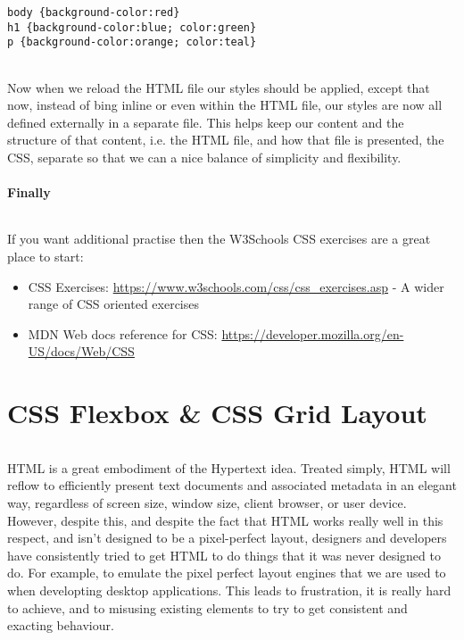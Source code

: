 \documentclass[10pt, a4paper, twosize]{article}
\begin{document}
\begin{lstlisting}
body {background-color:red}
h1 {background-color:blue; color:green}
p {background-color:orange; color:teal}
\end{lstlisting}

\paragraph{} Now when we reload the HTML file our styles should be applied, except that now, instead of bing inline or even within the HTML file, our styles are now all defined externally in a separate file. This helps keep our content and the structure of that content, i.e. the HTML file, and how that file is presented, the CSS, separate so that we can a nice balance of simplicity and flexibility.

\subsection*{Finally}
\paragraph{} If you want additional practise then the W3Schools CSS exercises are a great place to start:
\begin{itemize}
\item CSS Exercises: \url{https://www.w3schools.com/css/css_exercises.asp} - A wider range of CSS oriented exercises
\item MDN Web docs reference for CSS: \url{https://developer.mozilla.org/en-US/docs/Web/CSS}
\end{itemize}







\clearpage
\part{CSS Flexbox \& CSS Grid Layout}
\paragraph{} HTML is a great embodiment of the Hypertext idea. Treated simply, HTML will reflow to efficiently present text documents and associated metadata in an elegant way, regardless of screen size, window size, client browser, or user device. However, despite this, and despite the fact that HTML works really well in this respect, and isn't designed to be a pixel-perfect layout, designers and developers have consistently tried to get HTML to do things that it was never designed to do. For example, to emulate the pixel perfect layout engines that we are used to when developting desktop applications. This leads to frustration, it is really hard to achieve, and to misusing existing elements to try to get consistent and exacting behaviour.
\end{document}
